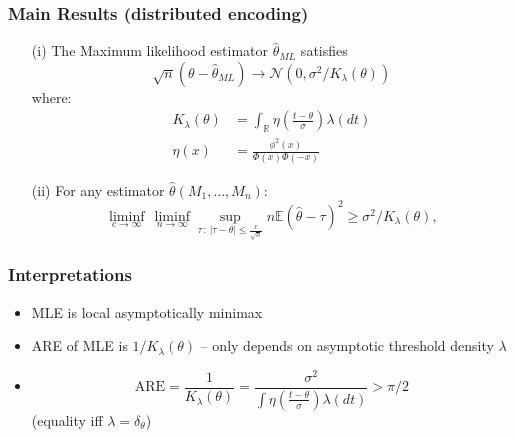 \documentclass[mathserif]{beamer}
\begin{document}
\begin{frame}
\frametitle{Main Results (distributed encoding)}
\pause
\begin{theorem}
\begin{itemize}
\item[(i)] The Maximum likelihood estimator $\widehat{\theta}_{ML}$  satisfies
\[
\sqrt{n}(\theta - \widehat{\theta}_{ML}) \rightarrow \mathcal N\left(0,\sigma^2/K_\lambda(\theta) \right)
\]
where:
\begin{align*}
K_\lambda(\theta) & = \int_{\mathbb R} \eta\left( \frac{t-\theta}{\sigma}\right) \lambda(dt) \\
\eta(x) & = \frac{\phi^2(x)}{\Phi(x)\Phi(-x)}
\end{align*}
\pause
\item[(ii)] For any estimator $\widehat{\theta}(M_1,\ldots,M_n)$:
\[
\liminf_{c\rightarrow \infty}\, \liminf_{n\rightarrow \infty} \sup_{\tau\,:\,| \tau - \theta| \leq \frac{c}{\sqrt{n}} }  n \mathbb E \left(\widehat{\theta} - \tau \right)^2 \geq \sigma^2/K_\lambda(\theta),
\]

\end{itemize}
\end{theorem}
\end{frame}


\begin{frame}
\frametitle{Interpretations}
\begin{itemize}
\pause
\item MLE is local asymptotically minimax 
\pause
\item  ARE of MLE is $1/K_{\lambda}(\theta)$ -- 
only depends on asymptotic threshold density $\lambda$
\pause
\item
\[
\mathrm{ARE} = \frac{1}{K_{\lambda}(\theta)}  = \frac{\sigma^2}{\int \eta \left( \frac{t-\theta}{\sigma}\right) \lambda(dt)}
> \pi / 2
\]
(equality iff $\lambda = \delta_{\theta}$)

%

\end{itemize}

\end{frame}
\end{document}

